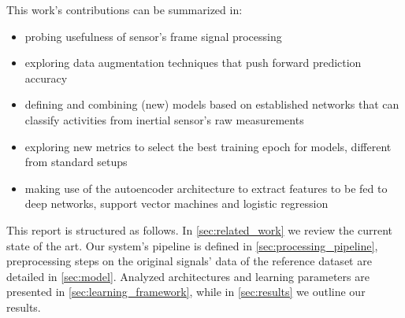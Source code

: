 This work's contributions can be summarized in:
\begin{itemize}
    \item probing usefulness of sensor's frame signal processing
    \item exploring data augmentation techniques that push forward prediction accuracy
    \item defining and combining (new) models based on established networks that can classify activities from inertial sensor's raw measurements
    \item exploring new metrics to select the best training epoch for models, different from standard setups
    \item making use of the autoencoder architecture to extract features to be fed to deep networks, support vector machines and logistic regression
\end{itemize}

This report is structured as follows.
In \autoref{sec:related_work} we review the current state of the art.
Our system's pipeline is defined in \autoref{sec:processing_pipeline}, preprocessing steps on the original signals' data of the reference dataset are detailed in \autoref{sec:model}.
Analyzed architectures and learning parameters are presented in \autoref{sec:learning_framework}, while in \autoref{sec:results} we outline our results.
\IEEEpubidadjcol
